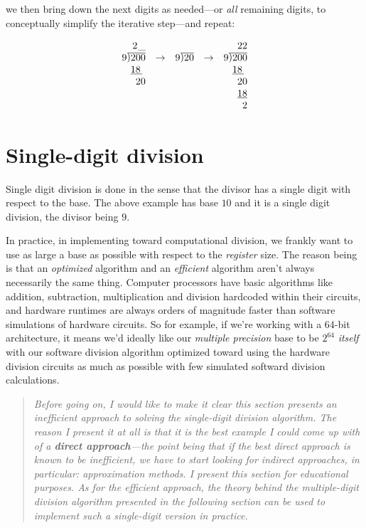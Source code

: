 \documentclass[twoside]{article}
\newcommand{\ldiv}[1]{\ensuremath{\raisebox{0.045em}{)}\hspace{-0.3275em}\overline{\ #1}}}
\begin{document}
\newpage

we then bring down the next digits as needed---or \emph{all} remaining digits,
to conceptually simplify the iterative step---and repeat:

$$ \begin{array}{rcrcr}
2\hspace{0.075em}\_		&	&		&	& 22					\\
9\ldiv{200}			& \to	& 9\ldiv{20}	& \to	& 9\ldiv{200}				\\
\underline{18\hspace{0.175em}}\	&	&		&	& \underline{18\hspace{0.175em}}\	\\
20				&	&		&	& 20					\\
				&	&		&	& \underline{18}			\\
				&	&		&	& 2					\\
\end{array} $$

\section*{Single-digit division}

Single digit division is done in the sense that the divisor has a single digit with respect to the base.
The above example has base $ 10 $ and it is a single digit division, the divisor being $ 9 $.

In practice, in implementing toward computational division, we frankly want to use as large a base as possible
with respect to the \emph{register} size. The reason being is that an \emph{optimized} algorithm and an \emph{efficient}
algorithm aren't always necessarily the same thing. Computer processors have basic algorithms like addition, subtraction,
multiplication and division hardcoded within their circuits, and hardware runtimes are always orders of magnitude faster
than software simulations of hardware circuits. So for example, if we're working with a $ 64 $-bit architecture, it means
we'd ideally like our \emph{multiple precision} base to be $ 2^{64} $ \emph{itself} with our software division algorithm
optimized toward using the hardware division circuits as much as possible with few simulated softward division calculations.

\begin{quote}
\em
Before going on, I would like to make it clear this section presents an inefficient approach to solving the
single-digit division algorithm. The reason I present it at all is that it is the best example I could come
up with of a {\bfseries direct approach}---the point being that if the best direct approach is known to be
inefficient, we have to start looking for indirect approaches, in particular: approximation methods.  I present
this section for educational purposes.  As for the efficient approach, the theory behind the multiple-digit division
algorithm presented in the following section can be used to implement such a single-digit version in practice.
\end{quote}
\end{document}
